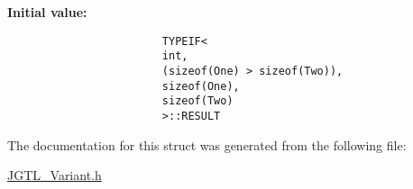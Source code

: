 \textbf{Initial value:}

\begin{Code}\begin{verbatim}
                        TYPEIF<
                        int,
                        (sizeof(One) > sizeof(Two)),
                        sizeof(One),
                        sizeof(Two)
                        >::RESULT
\end{verbatim}\end{Code}


The documentation for this struct was generated from the following file:\begin{CompactItemize}
\item 
\hyperlink{_j_g_t_l___variant_8h}{JGTL\_\-Variant.h}\end{CompactItemize}
